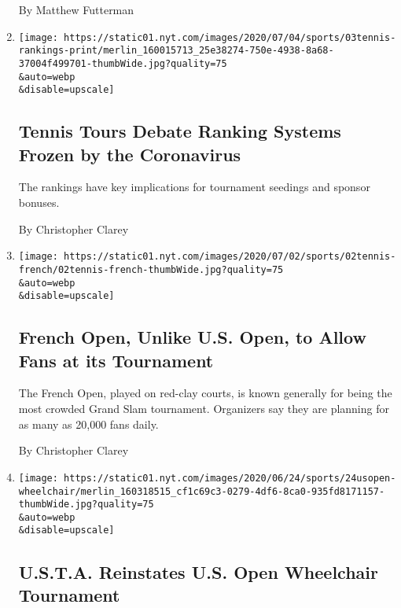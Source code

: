 \begin{enumerate}
  By Matthew Futterman
\item
  \href{/2020/07/04/sports/tennis/tennis-rankings-coronavirus.html}{}

  \texttt{[image: https://static01.nyt.com/images/2020/07/04/sports/03tennis-rankings-print/merlin\_160015713\_25e38274-750e-4938-8a68-37004f499701-thumbWide.jpg?quality=75\\\&auto=webp\\\&disable=upscale]}

  \hypertarget{tennis-tours-debate-ranking-systems-frozen-by-the-coronavirus}{%
  \subsection{Tennis Tours Debate Ranking Systems Frozen by the
  Coronavirus}\label{tennis-tours-debate-ranking-systems-frozen-by-the-coronavirus}}

  The rankings have key implications for tournament seedings and sponsor
  bonuses.

  By Christopher Clarey
\item
  \href{/2020/07/02/sports/tennis/french-open-fans.html}{}

  \texttt{[image: https://static01.nyt.com/images/2020/07/02/sports/02tennis-french/02tennis-french-thumbWide.jpg?quality=75\\\&auto=webp\\\&disable=upscale]}

  \hypertarget{french-open-unlike-us-open-to-allow-fans-at-its-tournament}{%
  \subsection{French Open, Unlike U.S. Open, to Allow Fans at its
  Tournament}\label{french-open-unlike-us-open-to-allow-fans-at-its-tournament}}

  The French Open, played on red-clay courts, is known generally for
  being the most crowded Grand Slam tournament. Organizers say they are
  planning for as many as 20,000 fans daily.

  By Christopher Clarey
\item
  \href{/2020/06/25/sports/tennis/us-open-wheelchair-tournament.html}{}

  \texttt{[image: https://static01.nyt.com/images/2020/06/24/sports/24usopen-wheelchair/merlin\_160318515\_cf1c69c3-0279-4df6-8ca0-935fd8171157-thumbWide.jpg?quality=75\\\&auto=webp\\\&disable=upscale]}

  \hypertarget{usta-reinstates-us-open-wheelchair-tournament}{%
  \subsection{U.S.T.A. Reinstates U.S. Open Wheelchair
  Tournament}\label{usta-reinstates-us-open-wheelchair-tournament}}


\end{enumerate}
